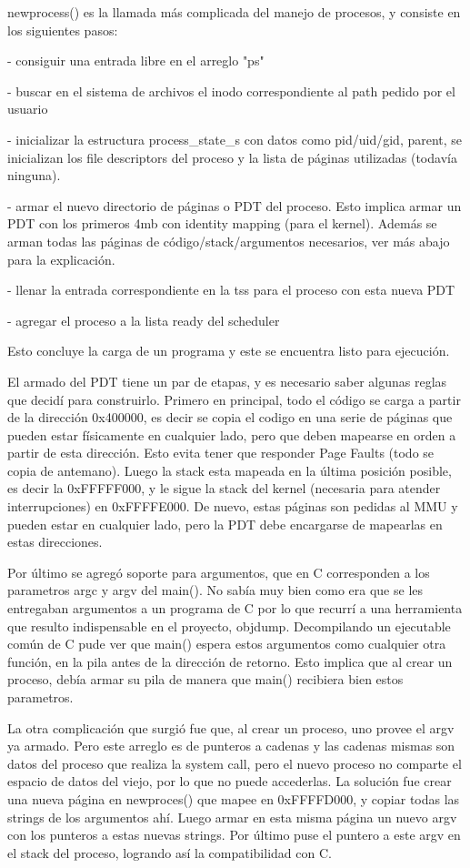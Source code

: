 newprocess() es la llamada más complicada del manejo de procesos, y consiste en
los siguientes pasos:

- consiguir una entrada libre en el arreglo "ps"

- buscar en el sistema de archivos el inodo correspondiente al path pedido
por el usuario

- inicializar la estructura process\_state\_s con datos como pid/uid/gid,
parent, se inicializan los file descriptors del proceso y la lista de páginas
utilizadas (todavía ninguna).

- armar el nuevo directorio de páginas o PDT del proceso. Esto implica armar
un PDT con los primeros 4mb con identity mapping (para el kernel). Además se
arman todas las páginas de código/stack/argumentos necesarios, ver más abajo
para la explicación.

- llenar la entrada correspondiente en la tss para el proceso con esta nueva
PDT

- agregar el proceso a la lista ready del scheduler

Esto concluye la carga de un programa y este se encuentra listo para ejecución.

El armado del PDT tiene un par de etapas, y es necesario saber algunas reglas
que decidí para construirlo. Primero en principal, todo el código se carga a
partir de la dirección 0x400000, es decir se copia el codigo en una serie de
páginas que pueden estar físicamente en cualquier lado, pero que deben mapearse
en orden a partir de esta dirección. Esto evita tener que responder Page Faults
(todo se copia de antemano). Luego la stack esta mapeada en la última posición
posible, es decir la 0xFFFFF000, y le sigue la stack del kernel (necesaria para
atender interrupciones) en 0xFFFFE000. De nuevo, estas páginas son pedidas al
MMU y pueden estar en cualquier lado, pero la PDT debe encargarse de mapearlas
en estas direcciones.

Por último se agregó soporte para argumentos, que en C corresponden a los
parametros argc y argv del main(). No sabía muy bien como era que se les
entregaban argumentos a un programa de C por lo que recurrí a una
herramienta que resulto indispensable en el proyecto, objdump. Decompilando un
ejecutable común de C pude ver que main() espera estos argumentos como cualquier
otra función, en la pila antes de la dirección de retorno. Esto implica que al
crear un proceso, debía armar su pila de manera que main() recibiera bien estos
parametros.

La otra complicación que surgió fue que, al crear un proceso, uno provee el
argv ya armado. Pero este arreglo es de punteros a cadenas y las cadenas mismas
son datos del proceso que realiza la system call, pero el nuevo proceso no
comparte el espacio de datos del viejo, por lo que no puede accederlas. La
solución fue crear una nueva página en newproces() que mapee en 0xFFFFD000, y
copiar todas las strings de los argumentos ahí. Luego armar en esta misma
página un nuevo argv con los punteros a estas nuevas strings. Por último puse
el puntero a este argv en el stack del proceso, logrando así la compatibilidad
con C.

